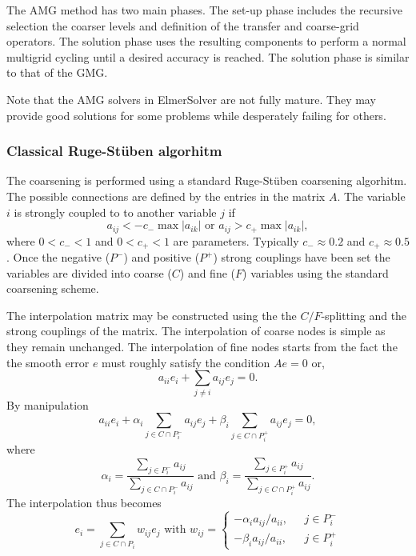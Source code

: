 \begin{versiona}
The AMG method has two main phases. The set-up phase includes the recursive selection
the coarser levels and definition of the transfer and coarse-grid operators. 
The solution phase uses the resulting components to perform a normal multigrid
cycling until a desired accuracy is reached. The solution phase is similar
to that of the GMG.

Note that the AMG solvers in ElmerSolver are not fully mature. They may provide good solutions for 
some problems while desperately failing for others. 


\subsubsection*{Classical Ruge-St{\"u}ben algorhitm}

The coarsening is performed using a standard Ruge-St{\"u}ben coarsening algorhitm. 
The possible connections are defined by the 
entries in the matrix $A$. The variable $i$ is strongly coupled
to to another variable $j$ if 
\begin{equation}
  a_{ij} < - c_{-} \max | a_{ik} |  \mbox{\ \ \ or \ \ \ }
  a_{ij} > c_{+} \max | a_{ik} | ,
\end{equation}
where $0<c_{-}<1$ and $0<c_{+}<1$ are parameters.
Typically $c_{-} \approx 0.2$ and $c_{+} \approx 0.5$.  
Once the negative ($P^{-}$) and positive ($P^{+}$) 
strong couplings have been set 
the variables are divided into coarse ($C$) and fine ($F$) 
variables using the standard coarsening scheme.

The interpolation matrix may be constructed 
using the the $C/F$-splitting and the strong couplings of the matrix.
The interpolation of coarse nodes is simple as they remain unchanged. 
The interpolation of fine nodes 
starts from the fact the the smooth error $e$ 
must roughly satisfy the condition $Ae=0$ or,
\begin{equation}
  a_{ii} e_i + \sum_{j \neq i} a_{ij} e_j = 0 .
  \label{eq_interpolate}
\end{equation}
By manipulation 
\begin{equation}
  a_{ii} e_i + \alpha_i \sum_{j \in C \cap P_i^{-}} a_{ij} e_j +
\beta_i \sum_{j \in C \cap P_i^{+}} a_{ij} e_j = 0,
\end{equation}
where
\begin{equation}
  \alpha_i = \frac{ \sum_{j \in P_i^{-}} a_{ij} }{ \sum_{j \in C \cap P_i^{-}} a_{ij}  }
 \mbox{\ \ \ and \ \ \ }
  \beta_i = \frac{ \sum_{j \in P_i^{+}} a_{ij} }{ \sum_{j \in C \cap P_i^{+}} a_{ij}  } .
\end{equation}
The interpolation thus becomes 
\begin{equation}
  e_i = \sum_{j \in C \cap P_i} w_{ij} e_j  \mbox{ \ \ \ with \ \ \ }
w_{ij} = \left \{ 
\begin{array}{ll}
-\alpha_i a_{ij} / a_{ii}, \mbox{ \ } & j \in P_i^{-} \\
-\beta_i a_{ij} / a_{ii},               & j \in P_i^{+}
\end{array} 
\right .
\end{equation}


\end{versiona}
